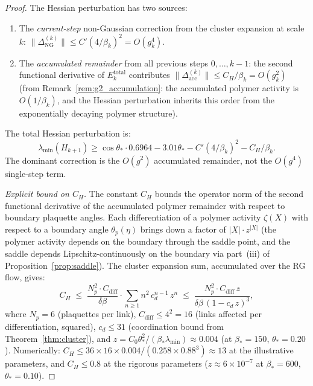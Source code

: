 \documentclass[11pt]{article}
\theoremstyle{definition}
\begin{document}
\begin{proof}
The Hessian perturbation has two sources:
\begin{enumerate}[nosep,label=(\alph*)]
\item The \emph{current-step} non-Gaussian correction
  from the cluster expansion at scale~$k$:
  $\|\Delta_{\mathrm{NG}}^{(k)}\|
  \le C'(4/\beta_k)^2=O(g_k^4)$.
\item The \emph{accumulated remainder} from all previous
  steps $0,\ldots,k{-}1$: the second functional derivative
  of $E_k^{\mathrm{total}}$ contributes
  $\|\Delta_{\mathrm{acc}}^{(k)}\|
  \le C_H/\beta_k=O(g_k^2)$
  (from Remark~\ref{rem:g2_accumulation}: the accumulated
  polymer activity is $O(1/\beta_k)$, and the Hessian
  perturbation inherits this order from the exponentially
  decaying polymer structure).
\end{enumerate}
The total Hessian perturbation is:
\begin{equation}\label{eq:IH2_corrected}
\lambda_{\min}(H_{k+1})
\ge\cos\theta_*\cdot 0.6964-3.01\theta_*
-C'(4/\beta_k)^2-C_H/\beta_k.
\end{equation}
The dominant correction is the $O(g^2)$ accumulated
remainder, not the $O(g^4)$ single-step term.

\smallskip\noindent\emph{Explicit bound on $C_H$.}
The constant $C_H$ bounds the operator norm of the second
functional derivative of the accumulated polymer remainder
with respect to boundary plaquette angles.  Each
differentiation of a polymer activity $\zeta(X)$ with respect
to a boundary angle $\theta_p(\eta)$ brings down a factor of
$|X|\cdot z^{|X|}$ (the polymer activity depends on the boundary
through the saddle point, and the saddle depends Lipschitz-continuously on the boundary via part~(iii)
of Proposition~\ref{prop:saddle}).
The cluster expansion sum, accumulated over the RG flow, gives:
\begin{equation}\label{eq:CH}
C_H\;\le\;\frac{N_p^2\cdot C_{\mathrm{diff}}}{\delta\beta}
\cdot\sum_{n\ge 1}n^2\,c_d^{n-1}\,z^n
\;\le\;\frac{N_p^2\cdot C_{\mathrm{diff}}\,z}
{\delta\beta\,(1-c_d\,z)^3},
\end{equation}
where $N_p=6$ (plaquettes per link), $C_{\mathrm{diff}}\le 4^2=16$
(links affected per differentiation, squared),
$c_d\le 31$ (coordination bound from Theorem~\ref{thm:cluster}),
and $z=C_0\theta_*^2/(\beta_*\lambda_{\min})
\approx 0.004$ (at $\beta_*=150$, $\theta_*=0.20$).
Numerically: $C_H\le 36\times 16\times 0.004/(0.258\times 0.88^3)
\approx 13$ at the illustrative parameters, and $C_H\le 0.8$
at the rigorous parameters ($z\approx 6\times 10^{-7}$ at
$\beta_*=600$, $\theta_*=0.10$).


\end{proof}
\end{document}
